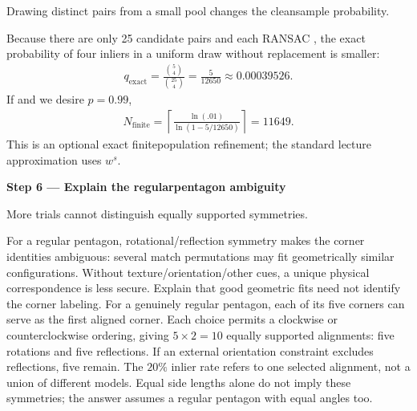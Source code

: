 \documentclass[letterpaper,11pt,english,openany,oneside]{jupyterBook}
\begin{document}
\sphinxAtStartPar
{} Drawing distinct pairs from a small pool changes the clean\sphinxhyphen{}sample probability.

\sphinxAtStartPar
Because there are only 25 candidate pairs and each RANSAC , the exact probability of four inliers in a uniform draw without replacement is smaller:
{\color{QuizMathBlue} \begin{equation*}
\begin{split}
q_{\mathrm{exact}}=\frac{\binom54}{\binom{25}4}=\frac5{12650}\approx0.00039526.
\end{split}
\end{equation*}}
\sphinxAtStartPar
If  and we desire {\color{QuizMathBlue} \(p=0.99\)},
{\color{QuizMathBlue} \begin{equation*}
\begin{split}
\boxed{N_{\mathrm{finite}}=\left\lceil\frac{\ln(.01)}{\ln(1-5/12650)}\right\rceil=11649}.
\end{split}
\end{equation*}}
\sphinxAtStartPar
This is an optional exact finite\sphinxhyphen{}population refinement; the standard lecture approximation uses {\color{QuizMathBlue} \(w^s\)}.

\par

\par\medskip{}
{\color{QuizStepRed}\bfseries Step 6 — Explain the regular\sphinxhyphen{}pentagon ambiguity}\par\smallskip

\sphinxAtStartPar
{} More trials cannot distinguish equally supported symmetries.

\sphinxAtStartPar
For a regular pentagon, rotational/reflection symmetry makes the corner identities ambiguous: several match permutations may fit geometrically similar configurations. Without texture/orientation/other cues, a unique physical correspondence is less secure. Explain that good geometric fits need not identify the  corner labeling.
For a genuinely regular pentagon, each of its five corners can serve as the first aligned corner. Each choice permits a clockwise or counterclockwise ordering, giving {\color{QuizMathBlue} \(5\times2=10\)} equally supported alignments: five rotations and five reflections. If an external orientation constraint excludes reflections, five remain. The {\color{QuizMathBlue} \(20\%\)} inlier rate refers to one selected alignment, not a union of different models. Equal side lengths alone do not imply these symmetries; the answer assumes a regular pentagon with equal angles too.
\end{document}
